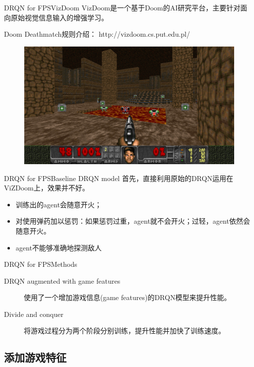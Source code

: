 \documentclass[10pt]{beamer}
\begin{document}
	\begin{frame}{DRQN for FPS}{VizDoom}
		VizDoom是一个基于Doom的AI研究平台，主要针对面向原始视觉信息输入的增强学习。
		
		Doom Deathmatch规则介绍：
		http://vizdoom.cs.put.edu.pl/
		
		\begin{figure}
			\centering
			\includegraphics[width=0.8\linewidth]{pictures/deathmatch}
		\end{figure}
	\end{frame}

	\begin{frame}{DRQN for FPS}{Baseline DRQN model}
		首先，直接利用原始的DRQN运用在ViZDoom上，效果并不好。
		\begin{itemize}
			\item<2-> 训练出的agent会随意开火；
			\item<3-> 对使用弹药加以惩罚：如果惩罚过重，agent就不会开火；过轻，agent依然会随意开火。
			\item<4-> agent不能够准确地探测敌人
		\end{itemize}
		
	\end{frame}

	\begin{frame}{DRQN for FPS}{Methods}
		\begin{description}
			\item[DRQN augmented with game features] 
			使用了一个增加游戏信息(game features)的DRQN模型来提升性能。
			
			\item[Divide and conquer]
			将游戏过程分为两个阶段分别训练，提升性能并加快了训练速度。
			
		\end{description}
	\end{frame}

	\subsection{添加游戏特征}
\end{document}
